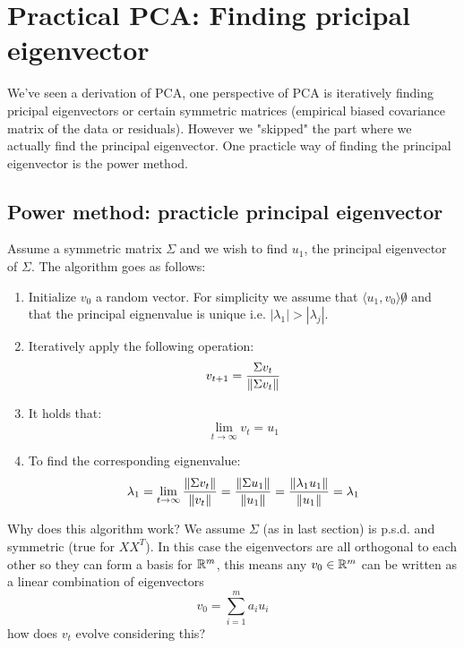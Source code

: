 	 \section{Practical PCA: Finding pricipal eigenvector}
	 We've seen a derivation of PCA, one perspective of PCA is iteratively finding pricipal eigenvectors or certain symmetric matrices (empirical biased covariance matrix of the data or residuals). However we "skipped" the part where we actually find the principal eigenvector. One practicle way of finding the principal eigenvector is the power method.
	 \subsection{Power method: practicle principal eigenvector}
	 Assume a symmetric matrix $\Sigma$ and we wish to find $u_1$, the principal eigenvector of $\Sigma$. The algorithm goes as follows:
	 \begin{enumerate}
	 	\item Initialize $v_0$ a random vector. For simplicity we assume that $\langle u_1,v_0\rangle \not 0$ and that the principal eignenvalue is unique i.e. $|\lambda_1| > |\lambda_j|$.
	 	\item Iteratively apply the following operation:
	 \begin{equation}
		 v_{t+1} = \frac{\Sigma v_t}{\left\lVert\Sigma v_t\right\rVert}
	 \end{equation}
	 \item It holds that:
	 \begin{equation}
		 \lim_{t\rightarrow\infty} v_t = u_1
	 \end{equation}
	 \item To find the corresponding eignenvalue:
	 \begin{equation}
		 \lambda_1 = \lim_{t\rightarrow\infty} \frac{\left\lVert\Sigma v_t\right\rVert}{\left\lVert v_t\right\rVert} = \frac{\left\lVert\Sigma u_1\right\rVert}{\left\lVert u_1\right\rVert} = \frac{\left\lVert\lambda_1u_1\right\rVert}{\left\lVert u_1\right\rVert} = \lambda_1
	 \end{equation}
	\end{enumerate}
	Why does this algorithm work? We assume $\Sigma$ (as in last section) is p.s.d. and symmetric (true for $XX^T$). In this case the eigenvectors are all orthogonal to each other so they can form a basis for $\mathbb{R}^m$, this means any $v_0 \in \mathbb{R}^m$ can be written as a linear combination of eigenvectors
	\begin{equation}
	\label{eq:eigenbasis}
	v_0 = \sum_{i=1}^{m} a_i u_i
	\end{equation}
	how does $v_t$ evolve considering this?
